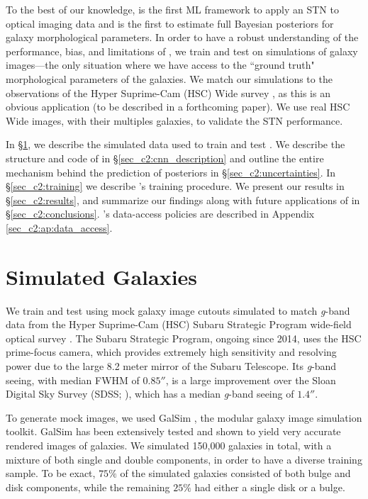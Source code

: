 To the best of our knowledge, \gampen{} is the first ML framework to apply an STN to optical imaging data and is the first to estimate full Bayesian posteriors for galaxy morphological parameters. In order to have a robust understanding of the performance, bias, and limitations of \gampen{}, we train and test \gampen{} on simulations of galaxy images---the only situation where we have access to the ``ground truth" morphological parameters of the galaxies. We match our simulations to the observations of the Hyper Suprime-Cam (HSC) Wide survey \citep{hsc_pdr1}, as this is an obvious application (to be described in a forthcoming paper).
We use real HSC Wide images, with their multiples galaxies, to validate the STN performance.


In \S \ref{sec_c2:sim_data}, we describe the simulated data used to train and test \gampen{}. We describe the structure and code of \gampen{} in \S \ref{sec_c2:cnn_description} and outline the entire mechanism behind the prediction of posteriors in \S \ref{sec_c2:uncertainties}. In \S \ref{sec_c2:training} we describe \gampen{}'s training procedure. We present our results in \S \ref{sec_c2:results}, and summarize our findings along with future applications of \gampen{} in \S \ref{sec_c2:conclusions}. \gampen{}'s data-access policies are described in Appendix  \ref{sec_c2:ap:data_access}. 

\section{Simulated Galaxies} \label{sec_c2:sim_data}
We train and test \gampen{} using mock galaxy image cutouts simulated to match \textit{g}-band data from the Hyper Suprime-Cam (HSC) Subaru Strategic Program wide-field optical survey \citep{hsc_pdr1}. The Subaru Strategic Program, ongoing since 2014, uses the HSC prime-focus camera, which provides extremely high sensitivity and resolving power due to the large 8.2 meter mirror of the Subaru Telescope. Its \textit{g}-band seeing, with median FWHM of $0.85''$, is a large improvement over the Sloan Digital Sky Survey (SDSS; \citealp{sdss_tech_summary}), which has a median \textit{g}-band seeing of $1.4''$.

To generate mock images, we used GalSim \citep{Rowe2015GalSim:Toolkit}, the modular galaxy image simulation toolkit. GalSim has been extensively tested and shown to yield very accurate rendered images of galaxies. We simulated 150,000 galaxies in total, with a mixture of both single and double components, in order to have a diverse training sample. To be exact, $75\%$ of the simulated galaxies consisted of both bulge and disk components, while the remaining $25\%$ had either a single disk or a bulge. 

